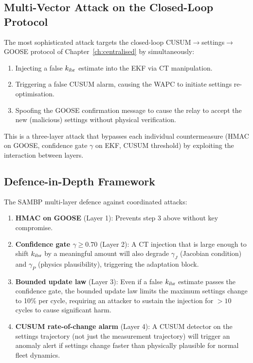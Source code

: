 \subsection{Multi-Vector Attack on the Closed-Loop Protocol}

The most sophisticated attack targets the closed-loop CUSUM$\to$settings$\to$GOOSE
protocol of Chapter~\ref{ch:centralised} by simultaneously:
\begin{enumerate}
\item Injecting a false $k_\mathrm{ibr}$ estimate into the EKF via CT manipulation.
\item Triggering a false CUSUM alarm, causing the WAPC to initiate
      settings re-optimisation.
\item Spoofing the GOOSE confirmation message to cause the relay to
      accept the new (malicious) settings without physical verification.
\end{enumerate}

This is a three-layer attack that bypasses each individual countermeasure
(HMAC on GOOSE, confidence gate $\gamma$ on EKF, CUSUM threshold) by
exploiting the interaction between layers.

\subsection{Defence-in-Depth Framework}

The SAMBP multi-layer defence against coordinated attacks:
\begin{enumerate}
\item \textbf{HMAC on GOOSE} (Layer 1): Prevents step 3 above without key compromise.
\item \textbf{Confidence gate $\gamma \geq 0.70$} (Layer 2): A CT injection
      that is large enough to shift $k_\mathrm{ibr}$ by a meaningful amount will
      also degrade $\gamma_J$ (Jacobian condition) and $\gamma_P$
      (physics plausibility), triggering the adaptation block.
\item \textbf{Bounded update law} (Layer 3): Even if a false $k_\mathrm{ibr}$
      estimate passes the confidence gate, the bounded update law
      limits the maximum settings change to 10\% per cycle, requiring
      an attacker to sustain the injection for $> 10$ cycles to cause
      significant harm.
\item \textbf{CUSUM rate-of-change alarm} (Layer 4): A CUSUM detector on
      the settings trajectory (not just the measurement trajectory)
      will trigger an anomaly alert if settings change faster than
      physically plausible for normal fleet dynamics.
\end{enumerate}

